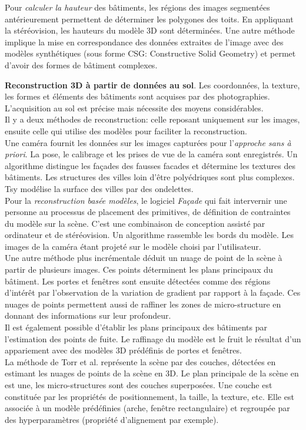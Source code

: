 \documentclass[11pt]{article}
\begin{document}
Pour \textit{calculer la hauteur} des bâtiments, les régions des images segmentées antérieurement permettent de déterminer les polygones des toits. En appliquant la stéréovision, les hauteurs du modèle 3D sont déterminées. Une autre méthode implique la mise en correspondance des données extraites de l'image avec des modèles synthétiques (sous forme CSG: Constructive Solid Geometry) et permet d'avoir des formes de bâtiment complexes.

\textbf{Reconstruction 3D à partir de données au sol}. Les coordonnées, la texture, les formes et éléments des bâtiments sont acquises par des photographies. L'acquisition au sol est précise mais nécessite des moyens considérables.\\
 Il y a deux méthodes de reconstruction: celle reposant uniquement sur les images, ensuite celle qui utilise des modèles pour faciliter la reconstruction.\\
Une caméra fournit les données sur les images capturées pour l'\textit{approche sans à priori}. La pose, le calibrage et les prises de vue de la caméra sont enregistrés. Un algorithme distingue les façades des fausses facades et détermine les textures des bâtiments. Les structures des villes loin d'être polyédriques sont plus complexes. Tsy modélise la surface des villes par des ondelettes.\\
Pour la \textit{reconstruction basée modèles}, le logiciel \textit{Façade} qui fait intervernir une personne au processus de placement des primitives, de définition de contraintes du modèle sur la scène. C'est une combinaison de conception assisté par ordinateur et de stéréovision. Un algorithme rassemble les bords du modèle. Les images de la caméra étant projeté sur le modèle choisi par l'utilisateur. \\
 Une autre méthode plus incrémentale déduit un nuage de point de la scène à partir de plusieurs images. Ces points déterminent les plans principaux du bâtiment. Les portes et fenêtres sont ensuite détectées comme des régions d'intérêt par l'observation de la variation de gradient par rapport à la façade. Ces nuages de points permettent aussi de raffiner les zones de micro-structure en donnant des informations sur leur profondeur. \\
 Il est également possible d'établir les plans principaux des bâtiments par l'estimation des points de fuite. Le raffinage du modèle est le fruit le résultat d'un appariement avec des modèles 3D prédéfinis de portes et fenêtres. \\
 La méthode de Torr et al. représente la scène par des couches, détectées en estimant les nuages de points de la scène en 3D. Le plan principale de la scène en est une, les micro-structures sont des couches superposées. Une couche est constituée par les propriétés de positionnement, la taille, la texture, etc. Elle est associée à un modèle prédéfinies (arche, fenêtre rectangulaire) et regroupée par des hyperparamètres (propriété d'alignement par exemple).
\end{document}
